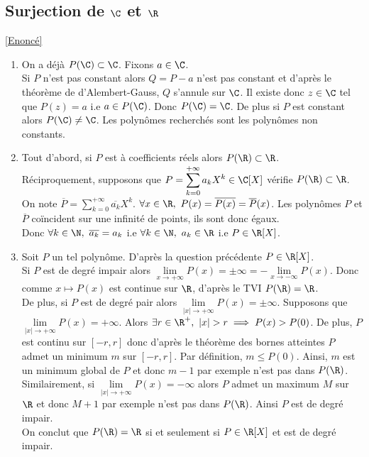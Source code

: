 \documentclass{book}
\begin{document}
	\subsection{Surjection de $\C$ et $\R$}
	\label{Surjection de C et R corrigé}
	\textcolor{blue}{\hyperref[Surjection de C et R]{[Enoncé]}}\\
	\begin{enumerate}[leftmargin=*]
		\item On a déjà $P(\C)\subset \C$. Fixons $a\in \C$.\\
		Si $P$ n'est pas constant alors $Q=P-a$ n'est pas constant et d'après le théorème de d'Alembert-Gauss, $Q$ s'annule sur $\C$. Il existe donc $z\in \C$ tel que  $P(z)=a$ i.e $a\in P(\C)$. Donc $P(\C)=\C$. De plus si $P$ est constant alors $P(\C)\ne \C$. Les polynômes recherchés sont les polynômes non constants.
		\item Tout d'abord, si $P$ est à coefficients réels alors $P(\R)\subset \R$.\\
		Réciproquement, supposons que $P=\displaystyle\sum\limits_{k=0}^{+\infty}{a_kX^k}\in \C[X]$ vérifie $P(\R)\subset \R$. On note $\overline{P}=\displaystyle\sum\limits_{k=0}^{+\infty}{\overline{a_k}X^k}$. $\forall x\in \R,\ P(x)=\overline{P(x)}=\overline{P}(x)$. Les polynômes $P$ et $\overline{P}$ coïncident sur une infinité de points, ils sont donc égaux.\\
		Donc $\forall k\in \N,\ \overline{a_k}=a_k$ i.e $\forall k\in \N,\ a_k\in \R$ i.e $P\in \R[X]$.
		\item Soit $P$ un tel polynôme. D'après la question précédente $P\in \R[X]$.\\
		Si $P$ est de degré impair alors $\lim\limits_{x\to +\infty}{P(x)}=\pm\infty=-\lim\limits_{x\to -\infty}{P(x)}$. Donc comme $x\mapsto P(x)$ est continue sur $\R$, d'après le TVI $P(\R)=\R$.\\
		De plus, si $P$ est de degré pair alors $\lim\limits_{|x|\to +\infty}{P(x)}=\pm\infty$. Supposons que $\lim\limits_{|x|\to +\infty}{P(x)}=+\infty$. Alors $\exists r\in \R^+,\ |x|> r\implies P(x)>P(0)$. De plus, $P$ est continu sur $[-r,r]$ donc d'après le théorème des bornes atteintes $P$ admet un minimum $m$ sur $[-r,r]$. Par définition, $m\leq P(0)$. Ainsi, $m$ est un minimum global de $P$ et donc $m-1$ par exemple n'est pas dans $P(\R)$.\\
		Similairement, si $\lim\limits_{|x|\to +\infty}{P(x)}=-\infty$ alors $P$ admet un maximum $M$ sur $\R$ et donc $M+1$ par exemple n'est pas dans $P(\R)$. Ainsi $P$ est de degré impair.\\
		On conclut que $P(\R)=\R$ si et seulement si $P\in \R[X]$ et est de degré impair.
	\end{enumerate}
	
\end{document}
